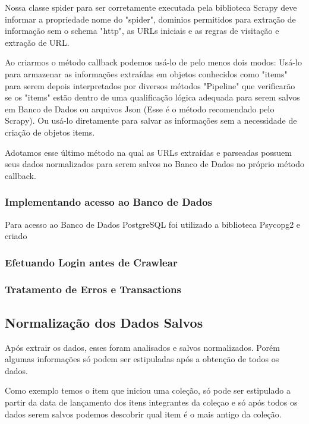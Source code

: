 \documentclass[12pt]{article}
\begin{document}
Nossa classe spider para ser corretamente executada pela biblioteca Scrapy deve informar a propriedade nome do "spider", dominios permitidos para extração de informação sem o schema "http", as URLs iniciais e as regras de visitação e extração de URL.

Ao criarmos o método callback podemos usá-lo de pelo menos dois modos: Usá-lo para armazenar as informações extraídas em objetos conhecidos como "items" para serem depois interpretados por diversos métodos "Pipeline" que verificarão se os "items" estão dentro de uma qualificação lógica adequada para serem salvos em Banco de Dados ou arquivos Json (Esse é o método recomendado pelo Scrapy). Ou usá-lo diretamente para salvar as informações sem a necessidade de criação de objetos items.

Adotamos esse último método na qual as URLs extraídas e parseadas possuem seus dados normalizados para serem salvos no Banco de Dados no próprio método callback.
 
 
 
 

\subsubsection{Implementando acesso ao Banco de Dados}

Para acesso ao Banco de Dados PostgreSQL foi utilizado a biblioteca Psycopg2 e criado 


\subsubsection{Efetuando Login antes de Crawlear}


\subsubsection{Tratamento de Erros e Transactions}






\subsection{Normalização dos Dados Salvos}

Após extrair os dados, esses foram analisados e salvos normalizados. Porém algumas informações só podem ser estipuladas após a obtenção de todos os dados.

Como exemplo temos o item que iniciou uma coleção, só pode ser estipulado a partir da data de lançamento dos itens integrantes da coleçao e só após todos os dados serem salvos podemos descobrir qual item é o mais antigo da coleção.
\end{document}
